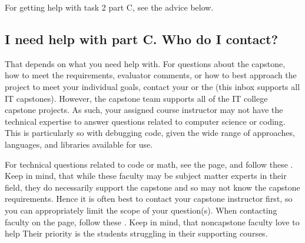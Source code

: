 \documentclass[letterpaper,10pt,english]{jupyterBook}
\begin{document}
\sphinxAtStartPar
For getting help with task 2 part C, see the advice below.


\subsection{I need help with part C. Who do I contact?}
\label{\detokenize{task2_c/task2_part_c:i-need-help-with-part-c-who-do-i-contact}}\label{\detokenize{task2_c/task2_part_c:task2-part-c-faq-i-need-help-with-part-c-who-do-i-contact}}
\sphinxAtStartPar
That depends on what you need help with. For questions about the capstone, how to meet the requirements, evaluator comments, or how to best approach the project to meet your individual goals, contact your {\hyperref[\detokenize{ci_c964:ci-c964}]{}} or the  (this inbox supports all IT capstones). However, the capstone team supports all of the IT college capstone projects. As such, your assigned course instructor may not have the technical expertise to answer questions related to computer science or coding. This is particularly so with debugging code, given the wide range of approaches, languages, and libraries available for use.

\sphinxAtStartPar
For technical questions related to code or math, see the {\hyperref[\detokenize{ci_other:ci-other}]{}} page, and follow these {\hyperref[\detokenize{ci_other:ci-other-better-questions-get-better-answers}]{}}. Keep in mind, that while these faculty may be subject matter experts in their field, they do  necessarily support the capstone and so may not know the capstone requirements. Hence it is often best to contact your capstone instructor first, so you can appropriately limit the scope of your question(s). When contacting faculty on the {\hyperref[\detokenize{ci_other:ci-other}]{}} page, follow these {\hyperref[\detokenize{ci_other:ci-other-better-questions-get-better-answers}]{}}. Keep in mind, that non\sphinxhyphen{}capstone faculty love to help  Their priority is the students struggling in their supporting courses.
\end{document}
